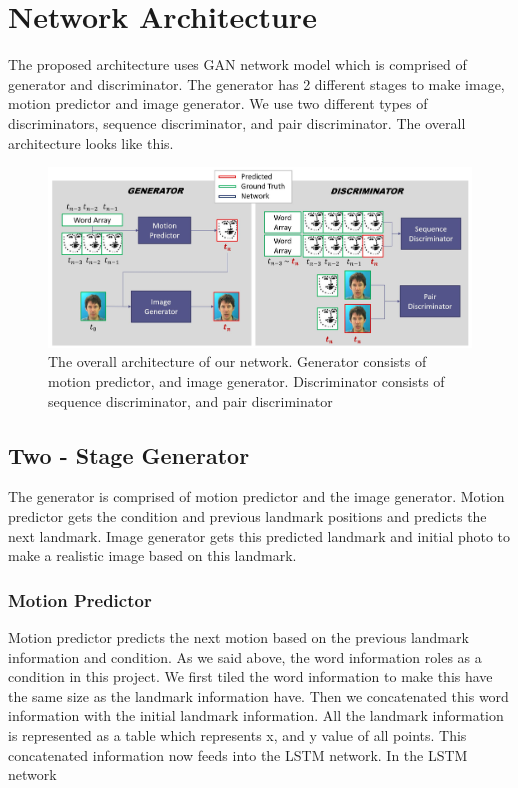 \documentclass[10pt,twocolumn,letterpaper]{article}
\begin{document}
\section{Network Architecture}
The proposed architecture uses GAN network model which is comprised of generator and discriminator. The generator has 2 different stages to make image, motion predictor and image generator. We use two different types of discriminators, sequence discriminator, and pair discriminator. The overall architecture looks like this.
\begin{figure}
\begin{center}
\includegraphics [scale=0.3] {images/network.JPG}
\end{center}
 \caption{The overall architecture of our network.  Generator consists of motion predictor, and image generator. Discriminator consists of sequence discriminator, and pair discriminator}
\label{fig:short}
\end{figure}


\subsection{Two - Stage Generator}
The generator is comprised of motion predictor and the image generator. Motion predictor gets the condition and previous landmark positions and predicts the next landmark. Image generator gets this predicted landmark and initial photo to make a realistic image based on this landmark.

\subsubsection{Motion Predictor}
Motion predictor predicts the next motion based on the previous landmark information and condition. As we said above, the word information roles as a condition in this project. We first tiled the word information to make this have the same size as the landmark information have. Then we concatenated this word information with the initial landmark information. All the landmark information is represented as a table which represents x, and y value of all points. This concatenated information now feeds into the LSTM network. In the LSTM network
\end{document}
